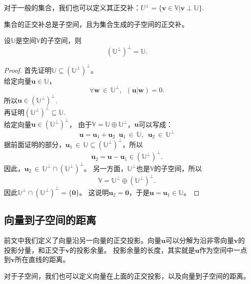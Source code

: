 \documentclass[12pt,UTF8,fontset=none]{ctexbook}
\begin{document}
对于一般的集合，我们也可以定义其正交补：$U^{\perp} = \{\mathbf{v} \in \mathbb{V} | \mathbf{v} \perp \mathbb{U}\}$.

集合的正交补总是子空间，且为集合生成的子空间的正交补。
\begin{pp}\label{pp:7_7_1}
    设$\mathbb{U}$是空间$\mathbb{V}$的子空间，则
    $$\left(\mathbb{U}^\perp\right)^\perp = \mathbb{U}.$$
\end{pp}
\begin{proof} %
    首先证明$\mathbb{U}\subseteq \left(\mathbb{U}^\perp\right)^\perp$。\\
    给定向量$\mathbf{u} \in \mathbb{U}$，
    $$\forall \mathbf{w} \, \in \, \mathbb{U}^\perp, \,\,\, (\mathbf{u} | \mathbf{w}) = 0.$$
    所以$\mathbf{u} \in \left(\mathbb{U}^\perp\right)^\perp$.\\
    再证明$\left(\mathbb{U}^\perp\right)^\perp \subseteq \mathbb{U}.$\\
    给定向量$\mathbf{u} \in \left(\mathbb{U}^\perp\right)^\perp$，
    由于$\mathbb{V} = \mathbb{U} \oplus \mathbb{U}^\perp$，$\mathbf{u}$可以写成：
    $$ \mathbf{u} = \mathbf{u}_1 + \mathbf{u}_2 \,\,\, \mathbf{u}_1 \,\in \, \mathbb{U}, \,\,\, \mathbf{u}_2 \,\in \, \mathbb{U}^\perp$$
    据前面证明的部分，$\mathbf{u}_1 \,\in \, \mathbb{U} \subseteq \left(\mathbb{U}^\perp\right)^\perp$，所以
    $$ \mathbf{u}_2 = \mathbf{u} - \mathbf{u}_1 \in \left(\mathbb{U}^\perp\right)^\perp.$$
    因此，$\mathbf{u}_2 \,\in \, \mathbb{U}^\perp \cap \left(\mathbb{U}^\perp\right)^\perp$。
    另一方面，$\mathbb{U}^\perp$也是$\mathbb{V}$的子空间，所以
    $$ \mathbb{V} = \mathbb{U}^\perp \oplus \left(\mathbb{U}^\perp\right)^\perp.$$
    因此$\mathbb{U}^\perp \cap \left(\mathbb{U}^\perp\right)^\perp = \{\mathbf{0}\}$。
    这说明$\mathbf{u}_2 = \mathbf{0}$，于是$\mathbf{u} = \mathbf{u}_1 \in  \mathbb{U}$。

\end{proof}


\subsection{向量到子空间的距离}
前文中我们定义了向量沿另一向量的正交投影。向量$\mathbf{u}$可以分解为沿非零向量$\mathbf{v}$的投影分量，和正交于$\mathbf{v}$的投影余量。
投影余量的长度，其实就是$\mathbf{u}$作为空间中一点到$\mathbf{v}$所在直线的距离。

对于子空间，我们也可以定义向量在上面的正交投影，以及向量到子空间的距离。
\end{document}
